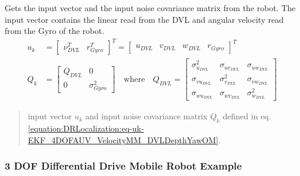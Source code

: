 \documentclass[letterpaper,10pt,english]{sphinxmanual}
\begin{document}
\begin{fulllineitems}
\begin{fulllineitems}
\label{\detokenize{DRLocalization:DR_4DOFAUV_DVLGyro.DR_4DOFAUV_DVLGyro.GetInput}}
\pysigstartsignatures
{}
\pysigstopsignatures
\sphinxAtStartPar
Gets the input vector and the input noise covariance matrix from the robot. The input vector contains the linear read from the DVL and angular velocity read from the Gyro of the robot.
\begin{equation}\label{equation:DRLocalization:eq-uk-EKF_4DOFAUV_VelocityMM_DVLDepthYawOM}
\begin{split}u_k &= \begin{bmatrix} \nu_{DVL}^T & r_{Gyro}^T \end{bmatrix}^T= \begin{bmatrix} u_{DVL} & v_{DVL} & w_{DVL} & r_{Gyro} \end{bmatrix}^T\\
Q_k &= \begin{bmatrix} Q_{DVL} & 0 \\ 0 & \sigma_{Gyro}^2 \end{bmatrix} \quad \text{where} \quad Q_{DVL} = \begin{bmatrix} \sigma_{u_{DVL}}^2 & \sigma_{{uv}_{DVL}} & \sigma_{{uw}_{DVL}} \\ \sigma_{{vu}_{DVL}} & \sigma_{v_{DVL}}^2 &  \sigma_{{vw}_{DVL}} \\ \sigma_{{wu}_{DVL}} & \sigma_{{wv}_{DVL}} & \sigma_{w_{DVL}}^2   \end{bmatrix}\end{split}
\end{equation}\begin{quote}\begin{description}
\sphinxAtStartPar
input vector \(u_k\) and input noise covariance matrix \(Q_k\) defined in eq. \eqref{equation:DRLocalization:eq-uk-EKF_4DOFAUV_VelocityMM_DVLDepthYawOM}.

\end{description}\end{quote}

\end{fulllineitems}


\end{fulllineitems}



\subsubsection{3 DOF Differential Drive Mobile Robot Example}
\label{\detokenize{DRLocalization:dof-differential-drive-mobile-robot-example}}
\begin{figure}[htbp]
\centering

\noindent{}
\end{figure}
\end{document}
